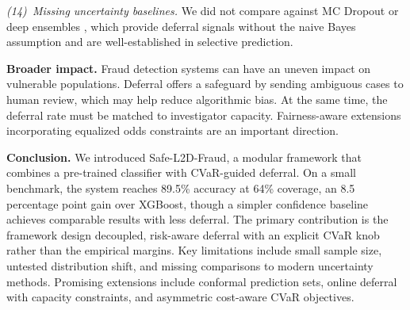 \textit{(14)~Missing uncertainty baselines.} We did not compare against MC Dropout \citep{gal2016dropout} or deep ensembles \citep{lakshminarayanan2017simple}, which provide deferral signals without the naive Bayes assumption and are well-established in selective prediction.

\textbf{Broader impact.}
Fraud detection systems can have an uneven impact on vulnerable populations. Deferral offers a safeguard by sending ambiguous cases to human review, which may help reduce algorithmic bias. At the same time, the deferral rate must be matched to investigator capacity. Fairness-aware extensions incorporating equalized odds constraints \citep{madras2018predict} are an important direction.

\textbf{Conclusion.}
We introduced Safe-L2D-Fraud, a modular framework that combines a pre-trained classifier with CVaR-guided deferral. On a small benchmark, the system reaches 89.5\% accuracy at 64\% coverage, an 8.5 percentage point gain over XGBoost, though a simpler confidence baseline achieves comparable results with less deferral. The primary contribution is the framework design decoupled, risk-aware deferral with an explicit CVaR knob rather than the empirical margins. Key limitations include small sample size, untested distribution shift, and missing comparisons to modern uncertainty methods. Promising extensions include conformal prediction sets, online deferral with capacity constraints, and asymmetric cost-aware CVaR objectives.
